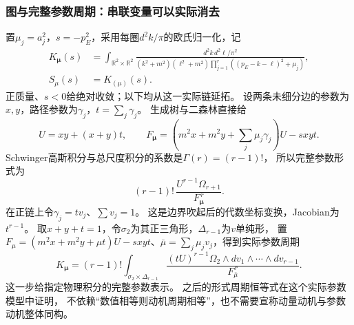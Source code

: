 \documentclass[11pt,a4paper,oneside]{ctexart}
\theoremstyle{cnplain}
\theoremstyle{definition}
\theoremstyle{remark}
\numberwithin{equation}{section}
\begin{document}
\subsubsection{图与完整参数周期：串联变量可以实际消去}
置$\mu_j=a_j^2$，$s=-p_E^2$，采用每圈$d^2k/\pi$的欧氏归一化，记
\begin{align}
 K_{\boldsymbol\mu}(s)
 &=\int_{\mathbb R^2\times\mathbb R^2}
 \frac{d^2k\,d^2\ell/\pi^2}
 {(k^2+m^2)(\ell^2+m^2)
       \prod_{j=1}^r((p_E-k-\ell)^2+\mu_j)}, \label{unified:eq:seriesmom}\\
 S_\mu(s)&=K_{(\mu)}(s).
\end{align}
正质量、$s<0$给绝对收敛；以下均从这一实际链延拓。
设两条未细分边的参数为$x,y$，路径参数为$\gamma_j$，$t=\sum_j\gamma_j$。
生成树与二森林直接给
\[
 U=xy+(x+y)t,\qquad
 F_{\boldsymbol\mu}
 =\left(m^2x+m^2y+\sum_j\mu_j\gamma_j\right)U-sxyt.
\]
Schwinger高斯积分与总尺度积分的系数是$\Gamma(r)=(r-1)!$，
所以完整参数形式为
\[
 (r-1)!\,\frac{U^{r-1}\Omega_{r+1}}{F_{\boldsymbol\mu}^{\,r}}.
\]
在正链上令$\gamma_j=t v_j$、$\sum v_j=1$。
这是边界吹起后的代数坐标变换，Jacobian为$t^{r-1}$。
取$x+y+t=1$，令$\sigma_2$为其正三角形，$\Delta_{r-1}$为$v$单纯形，
置$F_\mu=(m^2x+m^2y+\mu t)U-sxyt$、$\bar\mu=\sum_j\mu_jv_j$，得到实际参数周期
\begin{equation}\label{unified:eq:seriessimplex}
 K_{\boldsymbol\mu}
 =(r-1)!\int_{\sigma_2\times\Delta_{r-1}}
 \frac{(tU)^{r-1}\Omega_2\wedge dv_1\wedge\cdots\wedge dv_{r-1}}
 {F_{\bar\mu}^{\,r}}.
\end{equation}
这一步给指定物理积分的完整参数表示。
之后的形式周期恒等式在这个实际参数模型中证明，
不依赖“数值相等则动机周期相等”，也不需要宣称动量动机与参数动机整体同构。
\end{document}

